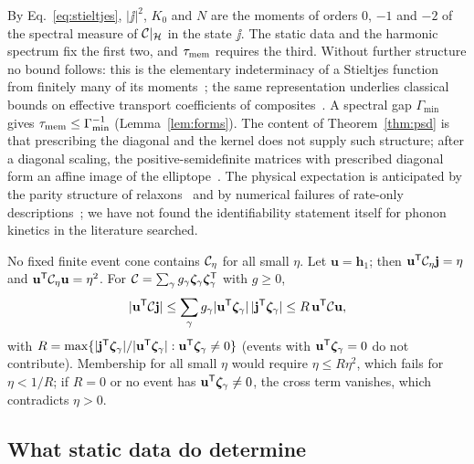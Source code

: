 \begin{remark}\label{rem:stieltjes}
By Eq.~\eqref{eq:stieltjes}, $|\jj|^2$, $K_0$ and $N$ are the moments of orders $0$, $-1$ and $-2$ of
the spectral measure of $\mathcal C|_{\mathcal H}$ in the state $\jj$. The static data and the harmonic spectrum fix
the first two, and $\tau_{\rm mem}$ requires the third. Without further structure no bound follows: this is the
elementary indeterminacy of a Stieltjes function from finitely many of its moments~\cite{Akhiezer2020,Schmudgen2017};
the same representation underlies classical bounds on effective transport coefficients of
composites~\cite{Golden1983}.
A spectral gap $\Gamma_{\min}$ gives $\tau_{\rm mem}\le\Gamma_{\min}^{-1}$ (Lemma~\ref{lem:forms}). The content
of Theorem~\ref{thm:psd} is that prescribing the diagonal and the kernel does not supply such
structure; after a diagonal scaling, the positive-semidefinite matrices with prescribed diagonal form an
affine image of the elliptope~\cite{Saunderson2012}. The physical expectation is anticipated by the parity
structure of relaxons~\cite{Simoncelli2020} and by numerical failures of rate-only
descriptions~\cite{MalviyaRavichandran2023}; we have not found the identifiability statement itself for
phonon kinetics in the literature searched.
\end{remark}

\begin{remark}\label{rem:notcone}
No fixed finite event cone contains $\mathcal C_\eta$ for all small $\eta$. Let $\mathbf u=\mathbf h_1$; then
$\mathbf u^{\mathsf T}\mathcal C_\eta\mathbf j=\eta$ and $\mathbf u^{\mathsf T}\mathcal C_\eta\mathbf u=\eta^2$. For
$\mathcal C=\sum_\gamma g_\gamma\bm\zeta_\gamma\bm\zeta_\gamma^{\mathsf T}$ with $g\ge0$,
\begin{equation}
|\mathbf u^{\mathsf T}\mathcal C\mathbf j|\le\sum_\gamma g_\gamma|\mathbf u^{\mathsf T}\bm\zeta_\gamma|\,|\mathbf j^{\mathsf T}\bm\zeta_\gamma|\le R\,\mathbf u^{\mathsf T}\mathcal C\mathbf u,
\label{eq:obstruction}
\end{equation}
with $R=\max\{|\mathbf j^{\mathsf T}\bm\zeta_\gamma|/|\mathbf u^{\mathsf T}\bm\zeta_\gamma|:\mathbf u^{\mathsf T}\bm\zeta_\gamma\ne0\}$
(events with $\mathbf u^{\mathsf T}\bm\zeta_\gamma=0$ do not contribute). Membership for all small $\eta$ would
require $\eta\le R\eta^2$, which fails for $\eta<1/R$; if $R=0$ or no event has
$\mathbf u^{\mathsf T}\bm\zeta_\gamma\ne0$, the cross term vanishes, which contradicts $\eta>0$.
\end{remark}

\subsection{What static data do determine}\label{sec:lower}

